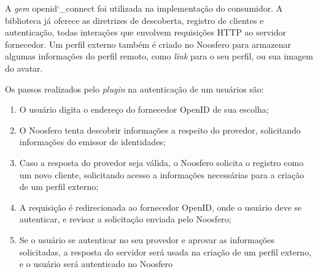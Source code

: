 \begin{apendicesenv}
A \textit{gem} openid\char`_connect foi utilizada na implementação do consumidor. A
biblioteca já oferece as diretrizes de descoberta, registro de clientes e
autenticação, todas interações que envolvem requisições HTTP ao servidor fornecedor.
Um perfil externo também é criado no Noosfero para armazenar algumas informações do
perfil remoto, como \textit{link} para o seu perfil, ou sua imagem do avatar.

Os passos realizados pelo \textit{plugin} na autenticação de um usuários são:

\begin{enumerate}
  \item{O usuário digita o endereço do fornecedor OpenID de sua escolha;}
  \item{O Noosfero tenta descobrir informações a respeito do provedor, solicitando
        informações do emissor de identidades;}
  \item{Caso a resposta do provedor seja válida, o Noosfero solicita o registro como
        um novo cliente, solicitando acesso a informações necessárias para a criação
        de um perfil externo;}
  \item{A requisição é redirecionada ao fornecedor OpenID, onde o usuário deve se
        autenticar, e revisar a solicitação enviada pelo Noosfero;}
  \item{Se o usuário se autenticar no seu provedor e aprovar as informações
        solicitadas, a resposta do servidor será usada na criação de um perfil
        externo, e o usuário será autenticado no Noosfero}
\end{enumerate}

\end{apendicesenv}
